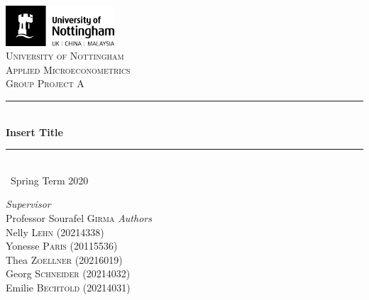 \documentclass[a4paper,11pt]{scrartcl}
\newcommand{\sectionnumbering}[1]{%
  \setcounter{section}{0}%
   \renewcommand{\thesection}{\csname #1\endcsname{section}}}
\begin{document}
	\begin{titlepage}
		\newcommand{\HRule}{\rule{\linewidth}{0.5mm}}
		
	\vfill\vfill
	\includegraphics[height=1.5cm]{UoN_Logo}\\[1cm] 


	\center			
	\textsc{\LARGE University of Nottingham}\\[1.5cm] 
	\textsc{\Large Applied Microeconometrics}\\[0.5cm] 	
	\textsc{\large Group Project A}\\[0.5cm] 
	
	\HRule\\[0.4cm]
	{\huge\bfseries Insert Title}\\[0.4cm] 
	\HRule\\[0.4cm]
	
	{\large\ Spring Term 2020} 	
	\vfill\vfill\vfill 		
	
\begin{flushleft}
			\large
			\textit{Supervisor}\\
			Professor Sourafel \textsc{Girma} 
			\vfill\vfill 
			\textit{Authors}\\
			Nelly  \textsc{Lehn} (20214338)\\
			Yonesse \textsc{Paris} (20115536)\\
			Thea  \textsc{Zoellner} (20216019)\\
			Georg  \textsc{Schneider} (20214032)\\
			Emilie \textsc{Bechtold} (20214031)
		\end{flushleft}
	\vfill 
	
\end{titlepage}


\sectionnumbering{Roman}
\tableofcontents

\newpage

\listoftables
\newpage

\sectionnumbering{arabic}
\end{document}
